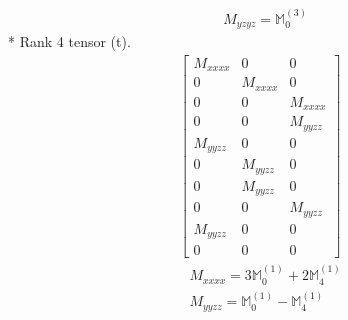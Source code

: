 \documentclass[fleqn,8pt,landscape]{jsarticle}
\begin{document}
\begin{align*}
& M_{yzyz} = \mathbb{M}_{0}^{(3)}
\end{align*}
* Rank 4 tensor (t).
\begin{align*}
\begin{bmatrix} M_{xxxx} & 0 & 0 \\ 0 & M_{xxxx} & 0 \\ 0 & 0 & M_{xxxx} \\ 0 & 0 & M_{yyzz} \\ M_{yyzz} & 0 & 0 \\ 0 & M_{yyzz} & 0 \\ 0 & M_{yyzz} & 0 \\ 0 & 0 & M_{yyzz} \\ M_{yyzz} & 0 & 0 \\ 0 & 0 & 0 \end{bmatrix}
\end{align*}
\begin{align*}
& M_{xxxx} = 3 \mathbb{M}_{0}^{(1)} + 2 \mathbb{M}_{4}^{(1)} \\
& M_{yyzz} = \mathbb{M}_{0}^{(1)} - \mathbb{M}_{4}^{(1)}
\end{align*}
\end{document}
